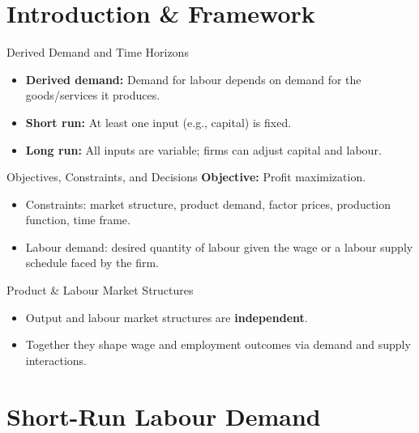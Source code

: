 \documentclass[aspectratio=169]{beamer}
\begin{document}
\section{Introduction \& Framework}

\begin{frame}{Derived Demand and Time Horizons}
\transfade
\begin{itemize}
  \item \textbf{Derived demand:} Demand for labour depends on demand for the goods/services it produces.
  \item \textbf{Short run:} At least one input (e.g., capital) is fixed.
  \item \textbf{Long run:} All inputs are variable; firms can adjust capital and labour.
\end{itemize}
\end{frame}

\begin{frame}{Objectives, Constraints, and Decisions}
\transfade
\textbf{Objective:} Profit maximization.
\begin{itemize}
  \item Constraints: market structure, product demand, factor prices, production function, time frame.
  \item Labour demand: desired quantity of labour given the wage or a labour supply schedule faced by the firm.
\end{itemize}
\end{frame}

\begin{frame}{Product \& Labour Market Structures}
\transfade
\begin{itemize}
  \item Output and labour market structures are \textbf{independent}.
  \item Together they shape wage and employment outcomes via demand and supply interactions.
\end{itemize}
\end{frame}

\section{Short-Run Labour Demand}
\end{document}
